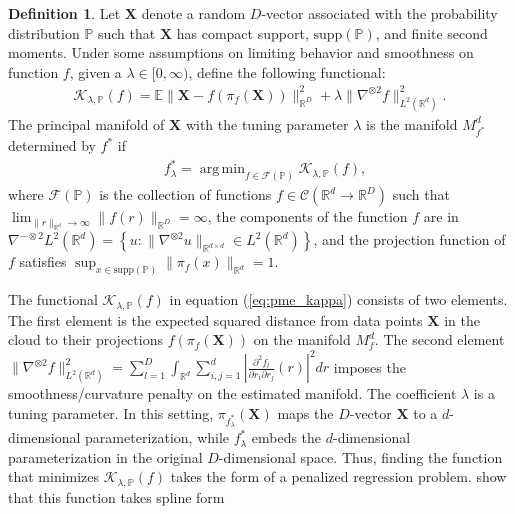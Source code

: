 \documentclass[11pt,reqno]{article}
\DeclareMathOperator*{\argmin}{arg\,min}
\theoremstyle{definition}
\newtheorem{definition}{Definition}
\begin{document}
\begin{definition}
  \label{def:principal_manifolds}
  Let $\mathbf{X}$ denote a random $D$-vector associated with the probability distribution $\mathbb{P}$ such that $\mathbf{X}$ has compact support, $\text{supp}(\mathbb{P})$, and finite second moments. Under some assumptions on limiting behavior and smoothness on function $f$, given a $\lambda \in [0, \infty)$, define the following functional:
  \begin{align}\label{eq:pme_kappa}
\mathcal{K}_{\lambda, \mathbb{P}}(f) = \mathbb{E}\|\mathbf{X} - f(\pi_f(\mathbf{X}))\|_{\mathbb{R}^{D}}^2 + \lambda\|\nabla^{\otimes 2}f\|_{L^2(\mathbb{R}^{d})}^2. 
  \end{align}
  The principal manifold of $\mathbf{X}$ with the tuning parameter $\lambda$ is the manifold $M_{f^{*}}^{d}$ determined by $f^{*}$ if
  \begin{equation}\nonumber
    \begin{aligned}
        & f_{\lambda}^{*} = \argmin_{f \in \mathcal{F}(\mathbb{P})}\mathcal{K}_{\lambda, \mathbb{P}}(f),
    \end{aligned}
  \end{equation}
where $\mathcal{F}(\mathbb{P})$ is the collection of functions $f \in \mathcal{C}(\mathbb{R}^{d} \to \mathbb{R}^{D})$ such that $\lim_{\|r\|_{\mathbb{R}^{d}} \to \infty}\|f(r)\|_{\mathbb{R}^{D}} = \infty$, the components of the function $f$ are in $\nabla^{-\otimes 2}L^2(\mathbb{R}^{d}) = \left\{u : \|\nabla^{\otimes 2} u\|_{\mathbb{R}^{d \times d}} \in L^2(\mathbb{R}^{d})\right\}$, and the projection function of $f$ satisfies $\sup_{x \in \text{supp}(\mathbb{P})}\|\pi_f(x)\|_{\mathbb{R}^{d}} = 1$.
\end{definition}
The functional $\mathcal{K}_{\lambda, \mathbb{P}}(f)$ in equation (\ref{eq:pme_kappa}) consists of two elements. The first element is the expected squared distance from data points $\mathbf{X}$ in the cloud to their projections $f(\pi_f(\mathbf{X}))$ on the manifold $M_f^d$. The second element $\|\nabla^{\otimes 2}f\|_{L^2(\mathbb{R}^{d})}^2 = \sum_{l=1}^{D} \int_{\mathbb{R}^{d}}\sum_{i, j = 1}^{d}\left|\frac{\partial^2f_l}{\partial r_i \partial r_j}(r)\right|^2dr$ imposes the smoothness/curvature penalty on the estimated manifold. The coefficient $\lambda$ is a tuning parameter. In this setting,  $\pi_{f_{\lambda}^{*}}(\mathbf{X})$ maps the $D$-vector $\mathbf{X}$ to a $d$-dimensional parameterization, while $f_{\lambda}^{*}$ embeds the $d$-dimensional parameterization in the original $D$-dimensional space. Thus, finding the function that minimizes $\mathcal{K}_{\lambda, \mathbb{P}}(f)$ takes the form of a penalized regression problem. \cite{mengPrincipalManifoldEstimation2021} show that this function takes spline form
\end{document}
